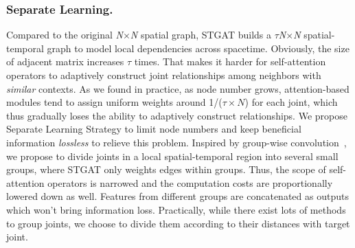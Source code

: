 \documentclass[runningheads]{llncs}
\begin{document}
\subsubsection{Separate Learning.}
Compared to the original \textit{N}$\times$\textit{N} spatial graph, STGAT builds a $\tau$\textit{N}$\times$\textit{N} spatial-temporal graph to model local dependencies across spacetime. Obviously, the size of adjacent matrix increases $\tau$ times. That makes it harder for self-attention operators to adaptively construct joint relationships among neighbors with \textit{similar} contexts.  As we found in practice, as node number grows, attention-based modules tend to assign uniform weights around 1/($\tau\times N$) for each joint, which thus gradually loses the ability to adaptively construct relationships. We propose Separate Learning Strategy to limit node numbers and keep beneficial information \textit{lossless} to relieve this problem. Inspired by group-wise convolution~\cite{krizhevsky2012imagenet}, we propose to divide joints in a local spatial-temporal region into several small groups, where STGAT only weights edges within groups. Thus, the scope of self-attention operators is narrowed and the computation costs are proportionally lowered down as well. Features from different groups are concatenated as outputs which won't bring information loss. Practically, while there exist lots of methods to group joints, we choose to divide them according to their distances with target joint. 
  
\end{document}
